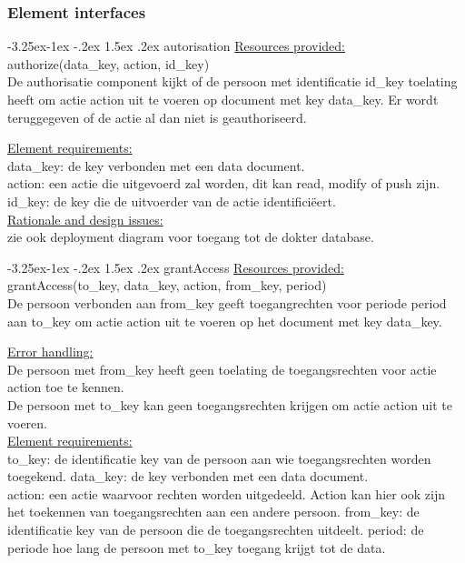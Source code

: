 \documentclass[a4paper,10pt]{book}
\makeatletter
\renewcommand\paragraph{\@startsection{paragraph}{4}{\z@}%
  {-3.25ex\@plus -1ex \@minus -.2ex}%
  {1.5ex \@plus .2ex}%
  {\normalfont\normalsize\bfseries}}
\makeatother
\begin{document}
\subsubsection{Element interfaces} 

\paragraph{autorisation}
\underline{Resources provided:}\\
authorize(data\_key, action, id\_key)\\
De authorisatie component kijkt of de persoon met identificatie id\_key toelating heeft om actie action uit te voeren op document met key data\_key.  Er wordt teruggegeven of de actie al dan niet is geauthoriseerd.

\underline{Element requirements:}\\
data\_key: de key verbonden met een data document.\\
action: een actie die uitgevoerd zal worden, dit kan read, modify of push zijn.\\
id\_key: de key die de uitvoerder van de actie identifici\"{e}ert.\\

\underline{Rationale and design issues:}\\
zie ook deployment diagram voor toegang tot de dokter database.

\paragraph{grantAccess}
\underline{Resources provided:}\\
grantAccess(to\_key, data\_key, action, from\_key, period)\\
De persoon verbonden aan from\_key geeft toegangrechten voor periode period aan to\_key om actie action uit te voeren op het document met key data\_key.

\underline{Error handling:}\\
De persoon met from\_key heeft geen toelating de toegangsrechten voor actie action toe te kennen.\\
De persoon met to\_key kan geen toegangsrechten krijgen om actie action uit te voeren.\\

\underline{Element requirements:}\\
to\_key: de identificatie key van de persoon aan wie toegangsrechten worden toegekend.
data\_key: de key verbonden met een data document.\\
action: een actie waarvoor rechten worden uitgedeeld.  Action kan hier ook zijn het toekennen van toegangsrechten aan een andere persoon.
from\_key: de identificatie key van de persoon die de toegangsrechten uitdeelt.
period: de periode hoe lang de persoon met to\_key toegang krijgt tot de data.
\end{document}
